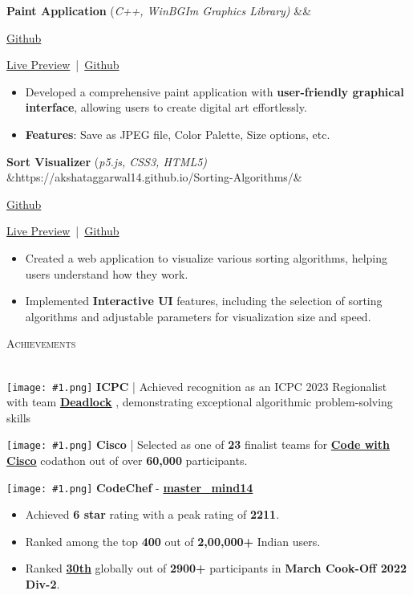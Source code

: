 \documentclass[a4paper]{article}
\newcommand{\tinyBulletSep} { \vspace{2mm} }
\newcommand{\bulletSep} { \vspace{2.5mm} }
\newcommand{\sectionSep} { \vspace{3.5mm} }
\newcommand{\lineunder} {
    \vspace*{-8pt} \\
    \hspace*{-15pt} \hrulefill \\
}
\newcommand{\header} [1] {
    {\hspace*{-18pt}\vspace*{6pt} {
        \fontfamily{qcs}\selectfont \large \scshape #1
    }}
    \vspace*{-6pt} \lineunder
    \vspace{1.1mm}
}
\newcommand{\linkFont}[1]{
    {\fontfamily{lmtt}\selectfont#1}
}
\newcommand{\link}[2]{
    {\fontfamily{lmtt}\selectfont\href{#1}{#2}}
}
\newcommand{\projectItem}[5]{
    {\textbf{#1}} {(\sl #2)}\hfill
    \ifx&#3&%
    \link{#4}{Github}\\
    \else
    \linkFont{\href{#3}{Live Preview}~|~\href{#4}{Github}}\\
    \fi
    \vspace{2pt}
    \begin{itemize}
        #5
    \end{itemize}
}
\newcommand{\image}[1]{
    \begingroup
    \normalfont
    \Large
    \texttt{[image: \#1.png]}%
    \endgroup
}
\begin{document}
\projectItem{Paint Application}{C++, WinBGIm Graphics Library}{}{https://github.com/Sahil-187/Paint-Application}{
    \item Developed a comprehensive paint application with \textbf{user-friendly graphical interface}, allowing users to create digital art effortlessly.
    \item \textbf{Features}: Save as JPEG file, Color Palette, Size options, etc.
}
\bulletSep

\projectItem{Sort Visualizer}{p5.js, CSS3, HTML5}{https://akshataggarwal14.github.io/Sorting-Algorithms/}{https://github.com/AkshatAggarwal14/Sorting-Algorithms/}{
    \item Created a web application to visualize various sorting algorithms, helping users understand how they work.
    \item Implemented \textbf{Interactive UI} features, including the selection of sorting algorithms and adjustable parameters for visualization size and speed.
}

\sectionSep


\header{Achievements}

\image{icpc} \textbf{ICPC} | Achieved recognition as an ICPC 2023 Regionalist with team \textbf{\link{https://icpc.global/ICPCID/6IIRHHSFPAXF}{Deadlock}}, demonstrating exceptional algorithmic problem-solving skills
\tinyBulletSep

\image{cisco} \textbf{Cisco} | Selected as one of \textbf{23} finalist teams for\textbf{\link{https://drive.google.com/file/d/1eBcJ4Ax0QHJq6Kb9MObrU1M9dQ7qvvbI/view?usp=sharing}{Code with Cisco}}codathon out of over \textbf{60,000} participants.
\tinyBulletSep

\image{cc} \textbf{CodeChef} -\textbf{\link{https://www.codechef.com/users/master_mind14}{master\_mind14}}
\begin{itemize}
    \item Achieved \textbf{6 star} rating with a peak rating of \textbf{2211}.
    \item Ranked among the top \textbf{400} out of \textbf{2,00,000+} Indian users.
    \item Ranked\textbf{\link{https://www.codechef.com/rankings/COOK139B?itemsPerPage=100&order=asc&page=1&search=master_mind14&sortBy=rank}{30th}}globally out of \textbf{2900+} participants in \textbf{March Cook-Off 2022 Div-2}.
\end{itemize}
\tinyBulletSep
\end{document}
